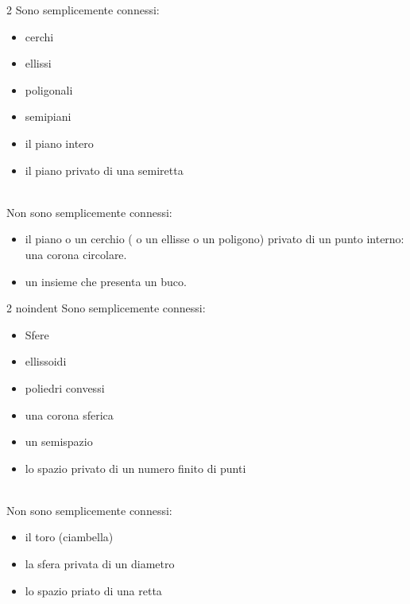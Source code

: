 \documentclass[a4paper, oneside]{article}
\begin{document}
\begin{example}[in $\mathbb{R}^2$]
\begin{multicols}{2}
    \noindent
        Sono semplicemente connessi:
    \begin{itemize}
        \item cerchi
        \item ellissi
        \item poligonali
        \item semipiani
        \item il piano intero
        \item il piano privato di una semiretta
    \end{itemize}
    \columnbreak
    \hfil\\
    Non sono semplicemente connessi:
    \begin{itemize}
        \item il piano o un cerchio ( o un ellisse o un poligono) privato di un punto interno: una corona circolare.
        \item un insieme che presenta un buco.
    \end{itemize}
\end{multicols}
\end{example}
\begin{example}[in $\mathbb{R}^3$]
    \begin{multicols}{2}
        noindent
        Sono semplicemente connessi:
    \begin{itemize}
        \item Sfere
        \item ellissoidi
        \item poliedri convessi
        \item una corona sferica
        \item un semispazio
        \item lo spazio privato di un numero finito di punti
    \end{itemize}
    \columnbreak
    \hfil\\
    Non sono semplicemente connessi:
    \begin{itemize}
        \item il toro (ciambella)
        \item la sfera privata di un diametro
        \item lo spazio priato di una retta
    \end{itemize}
    \end{multicols}
\end{example}
\end{document}
